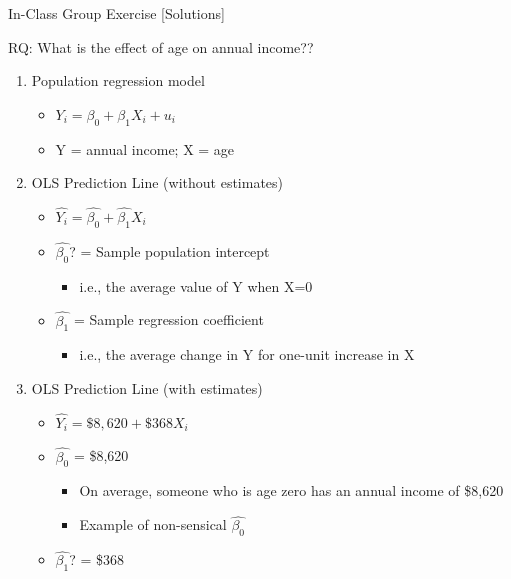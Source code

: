 \documentclass[
  8pt,
  ignorenonframetext,
  dvipsnames]{beamer}
\providecommand{\tightlist}{%
  \setlength{\itemsep}{0pt}\setlength{\parskip}{0pt}}
\let\olditem\item
\renewcommand{\item}{%
  \olditem\vspace{4pt}
}
\begin{document}
\begin{frame}{In-Class Group Exercise {[}Solutions{]}}
\protect\hypertarget{in-class-group-exercise-solutions}{}

RQ: What is the effect of age on annual income??

\begin{enumerate}
\tightlist
\item
  Population regression model

  \begin{itemize}
  \tightlist
  \item
    \(Y_i = \beta_0 + \beta_1X_i + u_i\)
  \item
    Y = annual income; X = age
  \end{itemize}
\item
  OLS Prediction Line (without estimates)

  \begin{itemize}
  \tightlist
  \item
    \(\hat{Y_i} = \hat{\beta_0} + \hat{\beta_1}X_i\)
  \item
    \(\hat{\beta_0}\)? = Sample population intercept

    \begin{itemize}
    \tightlist
    \item
      i.e., the average value of Y when X=0
    \end{itemize}
  \item
    \(\hat{\beta_1}\) = Sample regression coefficient

    \begin{itemize}
    \tightlist
    \item
      i.e., the average change in Y for one-unit increase in X
    \end{itemize}
  \end{itemize}
\item
  OLS Prediction Line (with estimates)

  \begin{itemize}
  \tightlist
  \item
    \(\hat{Y_i} = \$8,620 + \$368X_i\)
  \item
    \(\hat{\beta_0}\) = \$8,620

    \begin{itemize}
    \tightlist
    \item
      On average, someone who is age zero has an annual income of
      \$8,620
    \item
      Example of non-sensical \(\hat{\beta_0}\)
    \end{itemize}
  \item
    \(\hat{\beta_1}\)? = \$368


\end{itemize}
\end{enumerate}
\end{frame}
\end{document}
